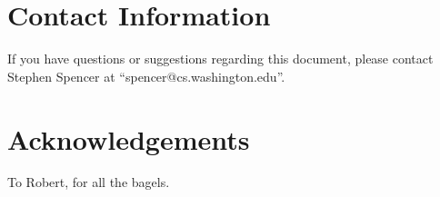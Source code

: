 \documentclass[tog]{acmsiggraph}
\begin{document}
\section{Contact Information}

If you have questions or suggestions regarding this document, please
contact Stephen Spencer at ``spencer@cs.washington.edu''.

\section*{Acknowledgements}

To Robert, for all the bagels.


\nocite{*}

\end{document}
